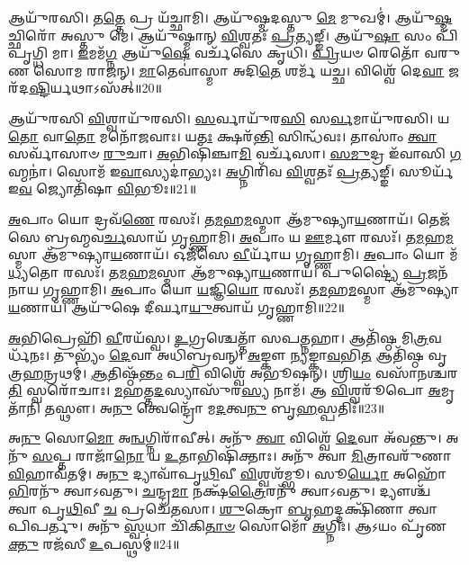 𑌆𑌯𑍁᳴𑌰𑌸𑌿।
𑌤\-\ul{𑌤𑍍𑌤𑍇} 𑌪𑍍𑌰 𑌯᳴𑌚𑍍𑌛𑌾𑌮𑌿।
𑌆𑌯𑍁᳴𑌷𑍍𑌮𑌦𑌸𑍍𑌤𑍁 \ul{𑌮𑍇} 𑌮𑍁𑌖𑌮𑍍॑।
𑌆𑌯𑍁᳴\-\ul{𑌷𑍍𑌮}\-𑌚𑍍𑌛𑌿𑌰𑍋᳴ 𑌅𑌸𑍍𑌤𑍁 𑌮𑍇।
𑌆𑌯𑍁᳴𑌷𑍍𑌮𑌾𑌨𑍍 \ul{𑌵𑌿}\-𑌶𑍍𑌵𑌤𑌃᳴ \ul{𑌪𑍍𑌰}\-𑌤𑍍𑌯𑌙𑍍𑌙𑍍।
𑌆𑌯𑍁᳴\-\ul{𑌷𑌾} 𑌸𑌂 𑌪𑌿᳴𑌪𑍃𑌗𑍍𑌧𑌿 𑌮𑌾।
\-\ul{𑌇}\-𑌮𑌮᳴\-\ul{𑌗𑍍𑌨} 𑌆𑌯𑍁᳴\-\ul{𑌷𑍇} 𑌵𑌰𑍍𑌚᳴𑌸𑍇 𑌕𑍃𑌧𑌿।
\-\ul{𑌪𑍍𑌰𑌿}\-𑌯𑍞 𑌰𑍇𑌤𑍋᳴ 𑌵𑌰𑍁𑌣 𑌸𑍋𑌮 𑌰𑌾𑌜𑌨𑍍।
\-\ul{𑌮𑌾}\-𑌤𑍇𑌵𑌾॑𑌸𑍍𑌮𑌾 𑌅𑌦𑌿\-\ul{𑌤𑍇} 𑌶𑌰𑍍𑌮᳴ 𑌯𑌚𑍍𑌛।
𑌵𑌿𑌶𑍍𑌵𑍇᳴ 𑌦𑍇\-\ul{𑌵𑌾} 𑌜𑌰᳴𑌦\-\ul{𑌷𑍍𑌟𑌿}\-𑌰𑍍𑌯𑌥𑌾\-𑌽𑌸᳴𑌤𑍍॥20॥

𑌆𑌯𑍁᳴𑌰𑌸𑌿 \ul{𑌵𑌿}\-𑌶𑍍𑌵𑌾𑌯𑍁᳴𑌰𑌸𑌿।
\-\ul{𑌸}\-𑌰𑍍𑌵𑌾𑌯𑍁᳴𑌰\-\ul{𑌸𑌿} 𑌸\-\ul{𑌰𑍍𑌵}\-𑌮𑌾𑌯𑍁᳴𑌰𑌸𑌿।
𑌯\-\ul{𑌤𑍋} 𑌵𑌾\-\ul{𑌤𑍋} 𑌮𑌨𑍋᳴𑌜𑌵𑌾𑌃।
𑌯\-\ul{𑌤𑌃} 𑌕𑍍𑌷𑌰᳴\-\ul{𑌨𑍍𑌤𑌿} 𑌸𑌿𑌨𑍍𑌧᳴𑌵𑌃।
𑌤𑌾𑌸𑌾𑌂॑ \ul{𑌤𑍍𑌵𑌾} 𑌸𑌰𑍍𑌵𑌾᳴𑌸𑌾𑍞 \ul{𑌰𑍁}\-𑌚𑌾।
\-\ul{𑌅}\-𑌭𑌿𑌷𑌿᳴𑌞𑍍𑌚𑌾\-\ul{𑌮𑌿} 𑌵𑌰𑍍𑌚᳴𑌸𑌾।
\-\ul{𑌸}\-\-\ul{𑌮𑍁}\-𑌦𑍍𑌰 𑌇᳴𑌵𑌾𑌸𑌿 \ul{𑌗}\-𑌹𑍍𑌮𑌨𑌾॑।
𑌸𑍋𑌮᳴ 𑌇\-\ul{𑌵𑌾}\-𑌸𑍍𑌯𑌦𑌾॑𑌭𑍍𑌯𑌃।
\-\ul{𑌅}\-𑌗𑍍𑌨𑌿𑌰𑌿᳴𑌵 \ul{𑌵𑌿}\-𑌶𑍍𑌵𑌤𑌃᳴ \ul{𑌪𑍍𑌰}\-𑌤𑍍𑌯𑌙𑍍𑌙𑍍।
𑌸𑍂𑌰𑍍𑌯᳴ 𑌇\-\ul{𑌵} 𑌜𑍍𑌯𑍋𑌤𑌿᳴𑌷𑌾 \ul{𑌵𑌿}\-𑌭𑍂𑌃॥21॥

\-\ul{𑌅}\-𑌪𑌾𑌂 𑌯𑍋 𑌦𑍍𑌰𑌵᳴\-\ul{𑌣𑍇} 𑌰𑌸𑌃᳴।
𑌤\-\ul{𑌮}\-𑌹\-\ul{𑌮}\-𑌸𑍍𑌮𑌾 𑌆᳴𑌮𑍁𑌷𑍍𑌯𑌾\-\ul{𑌯}\-𑌣𑌾𑌯᳴।
𑌤𑍇𑌜᳴𑌸𑍇 𑌬𑍍𑌰𑌹𑍍𑌮𑌵\-\ul{𑌰𑍍𑌚}\-𑌸𑌾𑌯᳴ 𑌗𑍃𑌹𑍍𑌣𑌾𑌮𑌿।
\-\ul{𑌅}\-𑌪𑌾𑌂 𑌯 \ul{𑌊}\-𑌰𑍍𑌮𑍗 𑌰𑌸𑌃᳴।
𑌤\-\ul{𑌮}\-𑌹\-\ul{𑌮}\-𑌸𑍍𑌮𑌾 𑌆᳴𑌮𑍁𑌷𑍍𑌯𑌾\-\ul{𑌯}\-𑌣𑌾𑌯᳴।
𑌓𑌜᳴𑌸𑍇 \ul{𑌵𑍀}\-𑌰𑍍𑌯𑌾᳴𑌯 𑌗𑍃𑌹𑍍𑌣𑌾𑌮𑌿।
\-\ul{𑌅}\-𑌪𑌾𑌂 𑌯𑍋 𑌮᳴\-\ul{𑌧𑍍𑌯}\-𑌤𑍋 𑌰𑌸𑌃᳴।
𑌤\-\ul{𑌮}\-𑌹\-\ul{𑌮}\-𑌸𑍍𑌮𑌾 𑌆᳴𑌮𑍁𑌷𑍍𑌯𑌾\-\ul{𑌯}\-𑌣𑌾𑌯᳴।
𑌪𑍁𑌷𑍍𑌟𑍍𑌯𑍈॑ \ul{𑌪𑍍𑌰}\-𑌜𑌨᳴𑌨𑌾𑌯 𑌗𑍃𑌹𑍍𑌣𑌾𑌮𑌿।
\-\ul{𑌅}\-𑌪𑌾𑌂 𑌯𑍋 \ul{𑌯}\-𑌜𑍍𑌞𑌿\-\ul{𑌯𑍋} 𑌰𑌸𑌃᳴।
𑌤\-\ul{𑌮}\-𑌹\-\ul{𑌮}\-𑌸𑍍𑌮𑌾 𑌆᳴𑌮𑍁𑌷𑍍𑌯𑌾\-\ul{𑌯}\-𑌣𑌾𑌯᳴।
𑌆𑌯𑍁᳴𑌷𑍇 𑌦𑍀𑌰𑍍𑌘𑌾\-\ul{𑌯𑍁}\-𑌤𑍍𑌵𑌾𑌯᳴ 𑌗𑍃𑌹𑍍𑌣𑌾𑌮𑌿॥22॥\anuvakamend[𑌗𑍋𑌷𑍍𑌵𑍋𑌜᳴𑌸𑍍𑌵𑌨𑍍𑌤𑍟 𑌶𑍍𑌰𑍀\-\ul{𑌣𑌾}\-𑌮𑍍𑌯𑍋𑌜𑍋᳴𑌽\-\ul{𑌸𑌿} 𑌤\-\ul{𑌤𑍍𑌤𑍇} 𑌪𑍍𑌰𑌯᳴𑌚𑍍𑌛𑌾\-\ul{𑌮𑌿} 𑌪𑌯᳴\-\ul{𑌸𑌾} 𑌸𑌮𑍍𑌪𑌿᳴𑌪𑍃\-\ul{𑌗𑍍𑌧𑌿} 𑌮𑌾𑌽𑌸᳴\-\ul{𑌦𑍍𑌵𑌿}\-𑌭𑍂\-\ul{𑌰𑍍𑌯}\-𑌜𑍍𑌞𑌿\-\ul{𑌯𑍋} 𑌰\-\ul{𑌸𑍋} 𑌦𑍍𑌵𑍇 𑌚᳴]

\-\ul{𑌅}\-𑌭𑌿𑌪𑍍𑌰𑍇𑌹𑌿᳴ \ul{𑌵𑍀}\-𑌰𑌯᳴𑌸𑍍𑌵।
\-\ul{𑌉}\-𑌗𑍍𑌰𑌶𑍍𑌚𑍇𑌤𑍍𑌤𑌾᳴ 𑌸𑌪\-\ul{𑌤𑍍𑌨}\-𑌹𑌾।
𑌆𑌤𑌿᳴𑌷𑍍𑌠 𑌮𑌿\-\ul{𑌤𑍍𑌰}\-𑌵𑌰𑍍𑌧᳴𑌨𑌃।
𑌤𑍁𑌭𑍍𑌯𑌂᳴ \ul{𑌦𑍇}\-𑌵𑌾 𑌅𑌧𑌿᳴𑌬𑍍𑌰𑌵𑌨𑍍।
\-\ul{𑌅}\-𑌙𑍍𑌕𑍗 \ul{𑌨𑍍𑌯}\-𑌙𑍍𑌕𑌾\-\ul{𑌵}\-𑌭𑌿\-\ul{𑌤} 𑌆𑌤𑌿᳴𑌷𑍍𑌠 𑌵𑍃𑌤𑍍𑌰\-\ul{𑌹}\-𑌨𑍍𑌰𑌥𑌮𑍍॑।
\-\ul{𑌆}\-𑌤𑌿𑌷𑍍𑌠᳴\-\ul{𑌨𑍍𑌤𑌂} 𑌪\-\ul{𑌰𑌿} 𑌵𑌿𑌶𑍍𑌵𑍇᳴ 𑌅𑌭𑍂𑌷𑌨𑍍।
𑌶𑍍𑌰𑌿\-\ul{𑌯𑌂} 𑌵𑌸𑌾᳴𑌨𑌶𑍍𑌚𑌰\-\ul{𑌤𑌿} 𑌸𑍍𑌵𑌰𑍋᳴𑌚𑌾𑌃।
\-\ul{𑌮}\-𑌹𑌤𑍍𑌤\-\ul{𑌦}\-𑌸𑍍𑌯𑌾𑌸𑍁᳴𑌰\-\ul{𑌸𑍍𑌯} 𑌨𑌾𑌮᳴।
𑌆 \ul{𑌵𑌿}\-𑌶𑍍𑌵𑌰𑍂᳴𑌪𑍋 \ul{𑌅}\-𑌮𑍃𑌤𑌾᳴𑌨𑌿 𑌤𑌸𑍍𑌥𑍗।
𑌅\-\ul{𑌨𑍁} 𑌤𑍍𑌵𑍇𑌨𑍍𑌦𑍍𑌰𑍋᳴ 𑌮\-\ul{𑌦}\-𑌤𑍍𑌵\-\ul{𑌨𑍁} 𑌬𑍃\-\ul{𑌹}\-𑌸𑍍𑌪𑌤𑌿𑌃᳴॥23॥

𑌅\-\ul{𑌨𑍁} 𑌸𑍋\-\ul{𑌮𑍋} 𑌅\-\ul{𑌨𑍍𑌵}\-𑌗𑍍𑌨𑌿𑌰𑌾᳴𑌵𑍀𑌤𑍍।
𑌅𑌨𑍁᳴ \ul{𑌤𑍍𑌵𑌾} 𑌵𑌿𑌶𑍍𑌵𑍇᳴ \ul{𑌦𑍇}\-𑌵𑌾 𑌅᳴𑌵𑌨𑍍𑌤𑍁।
𑌅𑌨𑍁᳴ \ul{𑌸}\-𑌪𑍍𑌤 𑌰𑌾𑌜𑌾᳴\-\ul{𑌨𑍋} 𑌯 \ul{𑌉}\-𑌤𑌾𑌭𑌿𑌷𑌿᳴𑌕𑍍𑌤𑌾𑌃।
𑌅𑌨𑍁᳴ 𑌤𑍍𑌵𑌾 \ul{𑌮𑌿}\-𑌤𑍍𑌰𑌾𑌵𑌰𑍁᳴𑌣𑌾\-\ul{𑌵𑌿}\-𑌹𑌾𑌵᳴𑌤𑌮𑍍।
𑌅\-\ul{𑌨𑍁} 𑌦𑍍𑌯𑌾𑌵𑌾᳴𑌪𑍃\-\ul{𑌥𑌿}\-𑌵𑍀 \ul{𑌵𑌿}\-𑌶𑍍𑌵𑌶᳴𑌮𑍍𑌭𑍂।
𑌸𑍂\-\ul{𑌰𑍍𑌯𑍋} 𑌅𑌹𑍋᳴\-\ul{𑌭𑌿}\-𑌰𑌨𑍁᳴ 𑌤𑍍𑌵𑌾𑌽𑌵𑌤𑍁।
\-\ul{𑌚}\-𑌨𑍍𑌦𑍍𑌰\-\ul{𑌮𑌾} 𑌨𑌕𑍍𑌷᳴\-\ul{𑌤𑍍𑌰𑍈}\-𑌰𑌨𑍁᳴ 𑌤𑍍𑌵𑌾𑌽𑌵𑌤𑍁।
𑌦𑍍𑌯𑍗𑌶𑍍𑌚᳴ 𑌤𑍍𑌵𑌾 𑌪𑍃\-\ul{𑌥𑌿}\-𑌵𑍀 \ul{𑌚} 𑌪𑍍𑌰𑌚𑍇᳴𑌤𑌸𑌾।
\-\ul{𑌶𑍁}\-𑌕𑍍𑌰𑍋 \ul{𑌬𑍃}\-𑌹𑌦𑍍𑌦𑌕𑍍𑌷𑌿᳴𑌣𑌾 𑌤𑍍𑌵𑌾 𑌪𑌿𑌪𑌰𑍍𑌤𑍁।
𑌅𑌨𑍁᳴ \ul{𑌸𑍍𑌵}\-𑌧𑌾 𑌚𑌿᳴𑌕𑌿\-\ul{𑌤𑌾}\-\-\ul{𑍞} 𑌸𑍋𑌮𑍋᳴ \ul{𑌅}\-𑌗𑍍𑌨𑌿𑌃।
𑌆𑌽𑌯𑌂 𑌪𑍃᳴𑌣\-\ul{𑌕𑍍𑌤𑍁} 𑌰𑌜᳴𑌸𑍀 \ul{𑌉}\-𑌪𑌸𑍍𑌥𑌮𑍍॑॥24॥\anuvakamend[𑌬𑍃\-\ul{𑌹}\-𑌸𑍍𑌪\-\ul{𑌤𑌿𑌃} 𑌸𑍋𑌮𑍋᳴ \ul{𑌅}\-𑌗𑍍𑌨𑌿𑌰𑍇𑌕𑌂᳴ 𑌚]

